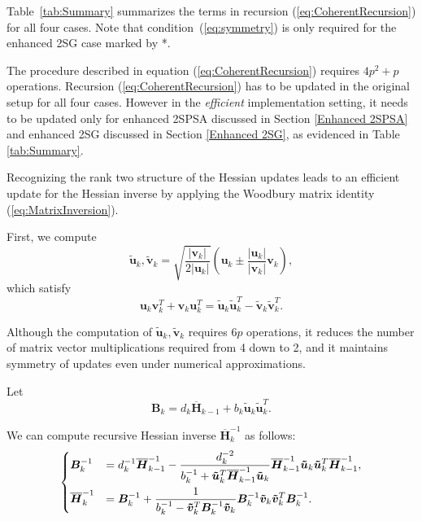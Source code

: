 \documentclass[conference]{IEEEtran}
\newcommand{\oH}{\bm{\overline{H}}}
\begin{document}
Table~\ref{tab:Summary} summarizes the terms in recursion
(\ref{eq:CoherentRecursion}) for all four cases. Note that
condition~(\ref{eq:symmetry}) is only required for the
enhanced 2SG case marked by *.

The procedure described in equation
(\ref{eq:CoherentRecursion}) requires $4p^2 + p$ operations. Recursion
(\ref{eq:CoherentRecursion}) has to be updated in the original setup
for all four cases. However in the \textit{efficient} implementation
setting, it needs to be updated only for enhanced 2SPSA discussed in
Section \ref{Enhanced 2SPSA} and enhanced 2SG discussed in Section
\ref{Enhanced 2SG}, as evidenced in Table \ref{tab:Summary}.

Recognizing the rank two structure of the Hessian updates leads to
an efficient update for the Hessian inverse by applying the Woodbury
matrix identity (\ref{eq:MatrixInversion}).

First, we compute
\begin{equation} \bm{\tilde{u}}_k, \bm{\tilde{v}}_k =
  \sqrt{\frac{|\bm{v}_k|}{2|\bm{u}_k|}} (\bm{u}_k \pm
  \frac{|\bm{u}_k|}{|\bm{v}_k|}\bm{v}_k),
\end{equation} which satisfy
\begin{equation*} \bm{u}_k \bm{v}_k^{T}+\bm{v}_k \bm{u}_k^{T}
  = \bm{\tilde{u}}_k \bm{\tilde{u}}_k^{T} - \bm{\tilde{v}}_k
  \bm{\tilde{v}}_k^{T}.
\end{equation*}

Although the computation of $\bm{\tilde{u}}_k,
\bm{\tilde{v}}_k$ requires $6p$ operations, it reduces the number of
matrix vector multiplications required from 4 down to 2, and it
maintains symmetry of updates even under numerical approximations.

Let
\begin{equation*} \bm{B}_k=d_k\oH_{k-1}+b_k\bm{\tilde{u}}_k
  \bm{\tilde{u}}_k^{T}.
\end{equation*}

We can compute recursive Hessian inverse $\oH_k^{-1}$ as follows:
\begin{equation} \label{eq:SequentialUpdate}
  \begin{dcases} \bm{B}_k^{-1} &= d_k^{-1}\oH_{k-1}^{-1}
    -
    \frac{d_k^{-2}}{b_k^{-1}+\bm{\tilde{u}}_k^{T}\oH_{k-1}^{-1}\bm{\tilde{u}}_k}
    \oH_{k-1}^{-1}\bm{\tilde{u}}_k \bm{\tilde{u}}_k^{T}\oH_{k-1}^{-1},\\
    \oH_k^{-1} &=\bm{B}_k^{-1} +
    \frac{1}{b_k^{-1}-\bm{\tilde{v}}_k^{T}\bm{B}_k^{-1}\bm{\tilde{v}}_k}
    \bm{B}_k^{-1}\bm{\tilde{v}}_k \bm{\tilde{v}}_k^{T}\bm{B}_{k}^{-1}.
  \end{dcases}
\end{equation}
\end{document}
